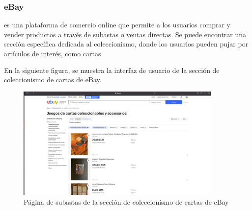 \subsubsection{eBay}
 es una plataforma de comercio online que permite a los usuarios comprar y vender productos a través de subastas o ventas directas. Se puede encontrar una sección específica dedicada al coleccionismo, donde los usuarios pueden pujar por artículos de interés, como cartas.

En la siguiente figura, se muestra la interfaz de usuario de la sección de coleccionismo de cartas de eBay.
\begin{figure}[H]
    \centering
    \includegraphics[width=0.9\textwidth]{figures/4-Estudio-viabilidad/4_Ebay.png}
    \caption{Página de subastas de la sección de coleccionismo de cartas de eBay}
    \label{fig:ebay}
    \hypertarget{fig:ebay}{}
\end{figure} 

